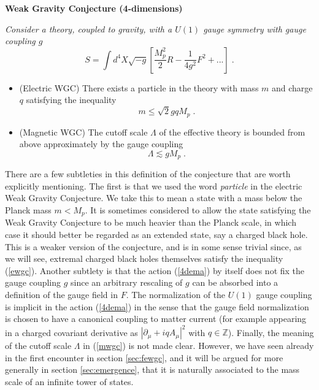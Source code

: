 \documentclass[11pt,a4paper]{article}
\numberwithin{equation}{section}
\numberwithin{table}{section}\setlength{\multlinegap}{25pt}
\newcommand{\be}{\begin{equation}}
\newcommand{\ee}{\end{equation}}
\begin{document}
\begin{tcolorbox}
{\bf Weak Gravity Conjecture (4-dimensions)} \;\cite{ArkaniHamed:2006dz}
{\it 
\newline
\newline
Consider a theory, coupled to gravity, with a $U(1)$ gauge symmetry with gauge coupling $g$
\be
\label{4dema}
S = \int d^4X \sqrt{-g} \left[ \frac{M_p^{2}}{2} R - \frac{1}{4g^2} F^2 + ... \right] \;.
\ee
\begin{itemize}
\item (Electric WGC) There exists a particle in the theory with mass $m$ and charge $q$ satisfying the inequality
\be
\label{ewgc}
m \leq \sqrt{2} g q M_p \;.
\ee
\item (Magnetic WGC) The cutoff scale $\Lambda$ of the effective theory is bounded from above approximately by the gauge coupling
\be
\label{mwgc}
\Lambda \lesssim g M_p \;.
\ee
\end{itemize}
}
\end{tcolorbox}

There are a few subtleties in this definition of the conjecture that are worth explicitly mentioning. The first is that we used the word {\it particle} in the electric Weak Gravity Conjecture. We take this to mean a state with a mass below the Planck mass $m < M_p$. It is sometimes considered to allow the state satisfying the Weak Gravity Conjecture to be much heavier than the Planck scale, in which case it should better be regarded as an extended state, say a charged black hole. This is a weaker version of the conjecture, and is in some sense trivial since, as we will see, extremal charged black holes themselves satisfy the inequality (\ref{ewgc}). Another subtlety is that the action (\ref{4dema}) by itself does not fix the gauge coupling $g$ since an arbitrary rescaling of $g$ can be absorbed into a definition of the gauge field in $F$. The normalization of the $U(1)$ gauge coupling is implicit in the action (\ref{4dema}) in the sense that the gauge field normalization is chosen to have a canonical coupling to matter current (for example appearing in a charged covariant derivative as $\left|\partial_{\mu} + i q A_{\mu} \right|^2$ with $q \in \mathbb{Z}$). Finally, the meaning of the cutoff scale $\Lambda$ in (\ref{mwgc}) is not made clear. However, we have seen already in the first encounter in section \ref{sec:fewgc}, and it will be argued for more generally in section \ref{sec:emergence}, that it is naturally associated to the mass scale of an infinite tower of states.
\end{document}
